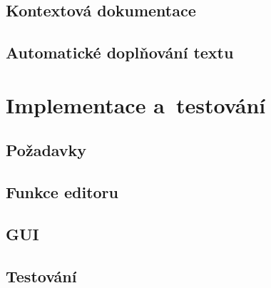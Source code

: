 \documentclass[FM,bw,DP]{tulthesis}
\begin{document}
\section{Kontextová dokumentace}

\section{Automatické doplňování textu}



\chapter{Implementace a~testování}


\section{Požadavky}





\section{Funkce editoru}

\section{GUI}

\section{Testování}


\end{document}
